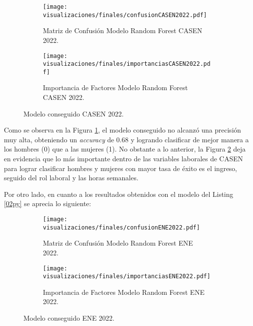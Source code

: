\FloatBarrier
\begin{figure}[htbp]
	\centering
	\begin{subfigure}[b]{0.49\textwidth}
		\centering
		\texttt{[image: visualizaciones/finales/confusionCASEN2022.pdf]}
		\caption{Matriz de Confusión Modelo Random Forest CASEN 2022.}
		\label{3a} 
	\end{subfigure}
	\hfill
	\begin{subfigure}[b]{0.49\textwidth}
		\centering
		\texttt{[image: visualizaciones/finales/importanciasCASEN2022.pdf]}
		\caption{Importancia de Factores Modelo Random Forest CASEN 2022.}
		\label{3b}
	\end{subfigure}
	\caption{Modelo conseguido CASEN 2022.}
	\label{03fig}
\end{figure}

\FloatBarrier

Como se observa en la Figura \ref{3a}, el modelo conseguido no alcanzó una precisión muy alta, obteniendo un \textit{accuracy} de 0.68 y logrando clasificar de mejor manera a los hombres (0) que a las mujeres (1). No obstante a lo anterior, la Figura \ref{3b} deja en evidencia que lo más importante dentro de las variables laborales de CASEN para lograr clasificar hombres y mujeres con mayor tasa de éxito es el ingreso, seguido del rol laboral y las horas semanales. 

Por otro lado, en cuanto a los resultados obtenidos con el modelo del Listing \ref{02py} se aprecia lo siguiente:

\FloatBarrier

\begin{figure}[htbp]
	\centering
	\begin{subfigure}[b]{0.49\textwidth}
		\centering
		\texttt{[image: visualizaciones/finales/confusionENE2022.pdf]}
		\caption{Matriz de Confusión Modelo Random Forest ENE 2022.}
		\label{4a} 
	\end{subfigure}
	\hfill
	\begin{subfigure}[b]{0.49\textwidth}
		\centering
		\texttt{[image: visualizaciones/finales/importanciasENE2022.pdf]}
		\caption{Importancia de Factores Modelo Random Forest ENE 2022.}
		\label{4b}
	\end{subfigure}
	\caption{Modelo conseguido ENE 2022.}
	\label{04fig}
\end{figure}

\FloatBarrier


